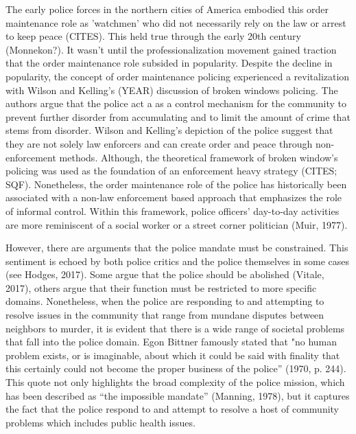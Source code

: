 The early police forces in the northern cities of America embodied this order maintenance role as 'watchmen' who did not necessarily rely on the law or arrest to keep peace (CITES). This held true through the early 20th century (Monnekon?). It wasn't until the professionalization movement gained traction that the order maintenance role subsided in popularity. Despite the decline in popularity, the concept of order maintenance policing experienced a revitalization with Wilson and Kelling's (YEAR) discussion of broken windows policing. The authors argue that the police act a as a control mechanism for the community to prevent further disorder from accumulating and to limit the amount of crime that stems from disorder. Wilson and Kelling's depiction of the police suggest that they are not solely law enforcers and can create order and peace through non-enforcement methods. Although, the theoretical framework of broken window's policing was used as the foundation of an enforcement heavy strategy (CITES; SQF). Nonetheless, the order maintenance role of the police has historically been associated with a non-law enforcement based approach that emphasizes the role of informal control. Within this framework, police officers’ day-to-day activities are more reminiscent of a social worker or a street corner politician (Muir, 1977). 

However, there are arguments that the police mandate must be constrained. This sentiment is echoed by both police critics and the police themselves in some cases (see Hodges, 2017). Some argue that the police should be abolished (Vitale, 2017), others argue that their function must be restricted to more specific domains. Nonetheless, when the police are responding to and attempting to resolve issues in the community that range from mundane disputes between neighbors to murder, it is evident that there is a wide range of societal problems that fall into the police domain. Egon Bittner famously stated that "no human problem exists, or is imaginable, about which it could be said with finality that this certainly could not become the proper business of the police” (1970, p. 244). This quote not only highlights the broad complexity of the police mission, which has been described as “the impossible mandate” (Manning, 1978), but it captures the fact that the police respond to and attempt to resolve a host of community problems which includes public health issues.

